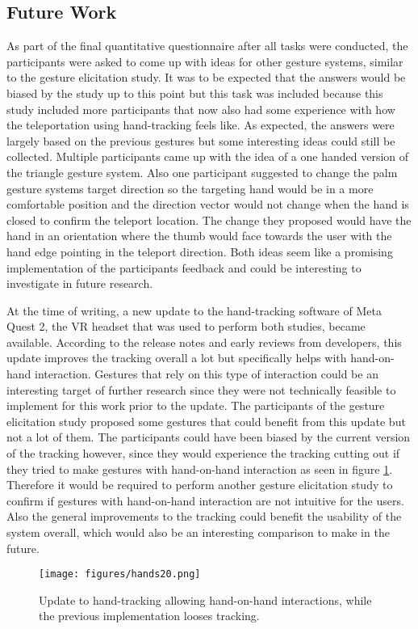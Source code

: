 \subsection{Future Work}

As part of the final quantitative questionnaire after all tasks were conducted, the participants were asked to come up with ideas for other gesture systems, similar to the gesture elicitation study. It was to be expected that the answers would be biased by the study up to this point but this task was included because this study included more participants that now also had some experience with how the teleportation using hand-tracking feels like. As expected, the answers were largely based on the previous gestures but some interesting ideas could still be collected. Multiple participants came up with the idea of a one handed version of the triangle gesture system. Also one participant suggested to change the palm gesture systems target direction so the targeting hand would be in a more comfortable position and the direction vector would not change when the hand is closed to confirm the teleport location. The change they proposed would have the hand in an orientation where the thumb would face towards the user with the hand edge pointing in the teleport direction. Both ideas seem like a promising implementation of the participants feedback and could be interesting to investigate in future research.

At the time of writing, a new update to the hand-tracking software of Meta Quest 2, the VR headset that was used to perform both studies, became available. According to the release notes and early reviews from developers, %
this update improves the tracking overall a lot but specifically helps with hand-on-hand interaction. Gestures that rely on this type of interaction could be an interesting target of further research since they were not technically feasible to implement for this work prior to the update. The participants of the gesture elicitation study proposed some gestures that could benefit from this update but not a lot of them. The participants could have been biased  by the current version of the tracking however, since they would experience the tracking cutting out if they tried to make gestures with hand-on-hand interaction as seen in figure \ref{fig:hands20}. Therefore it would be required to perform another gesture elicitation study to confirm if gestures with hand-on-hand interaction are not intuitive for the users. Also the general improvements to the tracking could benefit the usability of the system overall, which would also be an interesting comparison to make in the future. 

\begin{figure}[!ht]
    \centering
    \texttt{[image: figures/hands20.png]}
    \caption{Update to hand-tracking allowing hand-on-hand interactions, while the previous implementation looses tracking.}
    \label{fig:hands20}
\end{figure}